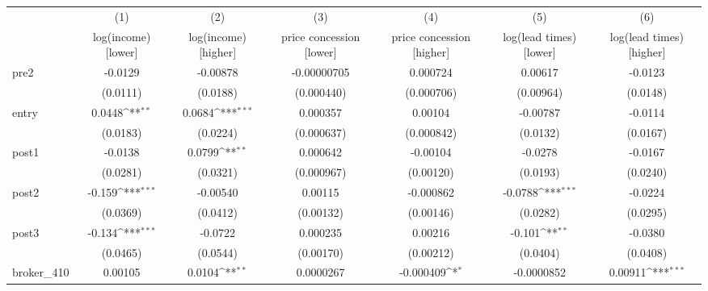 {
\def\sym#1{\ifmmode^{#1}\else\(^{#1}\)\fi}
\begin{tabular}{l*{6}{c}}
\toprule
            &\multicolumn{1}{c}{(1)}&\multicolumn{1}{c}{(2)}&\multicolumn{1}{c}{(3)}&\multicolumn{1}{c}{(4)}&\multicolumn{1}{c}{(5)}&\multicolumn{1}{c}{(6)}\\
            &\multicolumn{1}{c}{log(income) [lower]}&\multicolumn{1}{c}{log(income) [higher]}&\multicolumn{1}{c}{price concession [lower]}&\multicolumn{1}{c}{price concession [higher]}&\multicolumn{1}{c}{log(lead times) [lower]}&\multicolumn{1}{c}{log(lead times) [higher]}\\
\midrule
pre2        &     -0.0129         &    -0.00878         & -0.00000705         &    0.000724         &     0.00617         &     -0.0123         \\
            &    (0.0111)         &    (0.0188)         &  (0.000440)         &  (0.000706)         &   (0.00964)         &    (0.0148)         \\
\addlinespace
entry       &      0.0448\sym{**} &      0.0684\sym{***}&    0.000357         &     0.00104         &    -0.00787         &     -0.0114         \\
            &    (0.0183)         &    (0.0224)         &  (0.000637)         &  (0.000842)         &    (0.0132)         &    (0.0167)         \\
\addlinespace
post1       &     -0.0138         &      0.0799\sym{**} &    0.000642         &    -0.00104         &     -0.0278         &     -0.0167         \\
            &    (0.0281)         &    (0.0321)         &  (0.000967)         &   (0.00120)         &    (0.0193)         &    (0.0240)         \\
\addlinespace
post2       &      -0.159\sym{***}&    -0.00540         &     0.00115         &   -0.000862         &     -0.0788\sym{***}&     -0.0224         \\
            &    (0.0369)         &    (0.0412)         &   (0.00132)         &   (0.00146)         &    (0.0282)         &    (0.0295)         \\
\addlinespace
post3       &      -0.134\sym{***}&     -0.0722         &    0.000235         &     0.00216         &      -0.101\sym{**} &     -0.0380         \\
            &    (0.0465)         &    (0.0544)         &   (0.00170)         &   (0.00212)         &    (0.0404)         &    (0.0408)         \\
\addlinespace
broker\_410  &     0.00105         &      0.0104\sym{**} &   0.0000267         &   -0.000409\sym{*}  &  -0.0000852         &     0.00911\sym{***}\\

\end{tabular}}
